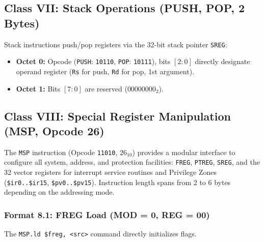 \documentclass[11pt,a4paper]{article}
\newcommand{\reg}[1]{\texttt{#1}}
\newcommand{\bits}[1]{\texttt{#1}}
\begin{document}
\subsection{Class VII: Stack Operations (PUSH, POP, 2 Bytes)}
Stack instructions push/pop registers via the 32-bit stack pointer \reg{SREG}:
\begin{itemize}
  \item \textbf{Octet 0:} Opcode (\texttt{PUSH}: \bits{10110}, \texttt{POP}: \bits{10111}), bits $[2:0]$ directly designate operand register (\reg{Rs} for push, \reg{Rd} for pop, 1st argument).
  \item \textbf{Octet 1:} Bits $[7:0]$ are reserved ($00000000_2$).
\end{itemize}

\subsection{Class VIII: Special Register Manipulation (MSP, Opcode 26)}
The \texttt{MSP} instruction (Opcode \bits{11010}, $26_{10}$) provides a modular interface to configure all system, address, and protection facilities: \reg{FREG}, \reg{PTREG}, \reg{SREG}, and the 32 vector registers for interrupt service routines and Privilege Zones (\texttt{\$ir0..\$ir15}, \texttt{\$pv0..\$pv15}). Instruction length spans from 2 to 6 bytes depending on the addressing mode.

\subsubsection{Format 8.1: FREG Load (MOD = 0, REG = 00)}
The \texttt{MSP.ld \$freg, <src>} command directly initializes flags.
\end{document}
